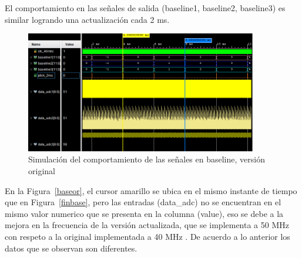 El comportamiento en las señales de salida (baseline1, baseline2, baseline3) es similar logrando una actualización cada 2 ms.




 
\begin{figure}[H]
\includegraphics[width=0.9\textwidth]{Figs/baselineori.PNG} 
\centering
\caption{Simulación del comportamiento de las señales en baseline, versión original}
\label{actu4ms}
\end{figure}

En la Figura~\ref{baseor}, el cursor amarillo se ubica en el mismo instante de tiempo que en Figura~\ref{finbase}, pero las entradas (data\_adc) no se encuentran en el mismo valor numerico que se presenta en la columna (value), eso se debe a la mejora en la frecuencia de la versión actualizada, que se implementa a 50 MHz con respeto a la original implementada a 40 MHz . De acuerdo a lo anterior los datos que se observan son diferentes.

